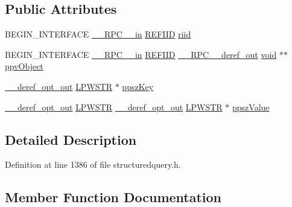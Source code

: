 \subsection*{Public Attributes}
\begin{DoxyCompactItemize}
\item 
B\+E\+G\+I\+N\+\_\+\+I\+N\+T\+E\+R\+F\+A\+CE \hyperlink{rpcsal_8h_a20b7f6da600a05c8b541659f14f7f0e6}{\+\_\+\+\_\+\+R\+P\+C\+\_\+\+\_\+in} \hyperlink{px__win__ds_8c_a80ec49c8ae61e234197d5071d2df497d}{R\+E\+F\+I\+ID} \hyperlink{struct_i_meta_data_vtbl_adced4a86b61b4f9a49651473dccbbe06}{riid}
\item 
B\+E\+G\+I\+N\+\_\+\+I\+N\+T\+E\+R\+F\+A\+CE \hyperlink{rpcsal_8h_a20b7f6da600a05c8b541659f14f7f0e6}{\+\_\+\+\_\+\+R\+P\+C\+\_\+\+\_\+in} \hyperlink{px__win__ds_8c_a80ec49c8ae61e234197d5071d2df497d}{R\+E\+F\+I\+ID} \hyperlink{rpcsal_8h_a23bc188526f10656f9c79d950f6c3192}{\+\_\+\+\_\+\+R\+P\+C\+\_\+\+\_\+deref\+\_\+out} \hyperlink{sound_8c_ae35f5844602719cf66324f4de2a658b3}{void} $\ast$$\ast$ \hyperlink{struct_i_meta_data_vtbl_aa7af8ff2762e620e1610ea909e461036}{ppv\+Object}
\item 
\hyperlink{sal_8h_aca83a5a174d598aaeea78f024e4af103}{\+\_\+\+\_\+deref\+\_\+opt\+\_\+out} \hyperlink{mapinls_8h_acc28f72b93422cfd63a60e5a102a77b1}{L\+P\+W\+S\+TR} $\ast$ \hyperlink{struct_i_meta_data_vtbl_a9568a86ffcaa3b0629f6eb516b01d6b1}{ppsz\+Key}
\item 
\hyperlink{sal_8h_aca83a5a174d598aaeea78f024e4af103}{\+\_\+\+\_\+deref\+\_\+opt\+\_\+out} \hyperlink{mapinls_8h_acc28f72b93422cfd63a60e5a102a77b1}{L\+P\+W\+S\+TR} \hyperlink{sal_8h_aca83a5a174d598aaeea78f024e4af103}{\+\_\+\+\_\+deref\+\_\+opt\+\_\+out} \hyperlink{mapinls_8h_acc28f72b93422cfd63a60e5a102a77b1}{L\+P\+W\+S\+TR} $\ast$ \hyperlink{struct_i_meta_data_vtbl_a2a23b660e8d81a26563e8d7c592f4106}{ppsz\+Value}
\end{DoxyCompactItemize}


\subsection{Detailed Description}


Definition at line 1386 of file structuredquery.\+h.



\subsection{Member Function Documentation}

